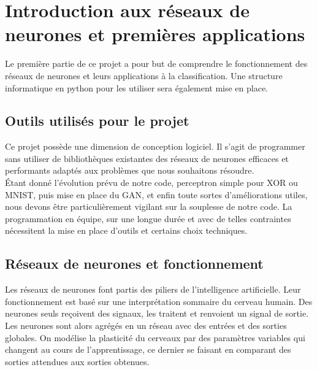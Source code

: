 

\chapter{Introduction aux réseaux de neurones et premières applications}
Le première partie de ce projet a pour but de comprendre le fonctionnement des réseaux de neurones et leurs applications à la classification. Une structure informatique en python pour les utiliser sera également mise en place.

\section{Outils utilisés pour le projet}

Ce projet possède une dimension de conception logiciel. Il s'agit de programmer sans utiliser de bibliothèques existantes des réseaux de neurones efficaces et performants adaptés aux problèmes que nous souhaitons résoudre.\\
Étant donné l'évolution prévu de notre code, perceptron simple pour XOR ou  MNIST, puis mise en place du GAN, et enfin toute sortes d'améliorations utiles, nous devons être particulièrement vigilant sur la souplesse de notre code. La programmation en équipe, sur une longue durée et avec de telles contraintes nécessitent la mise en place d'outils et certains choix techniques.

\section{Réseaux de neurones et fonctionnement}


Les réseaux de neurones font partis des piliers de l'intelligence artificielle. Leur fonctionnement est basé sur une interprétation sommaire du cerveau humain. Des neurones seuls reçoivent des signaux, les traitent et renvoient un signal de sortie. Les neurones sont alors agrégés en un réseau avec des entrées et des sorties globales. On modélise la plasticité du cerveaux par des paramètres variables qui changent au cours de l'apprentissage, ce dernier se faisant en comparant des sorties attendues aux sorties obtenues.


